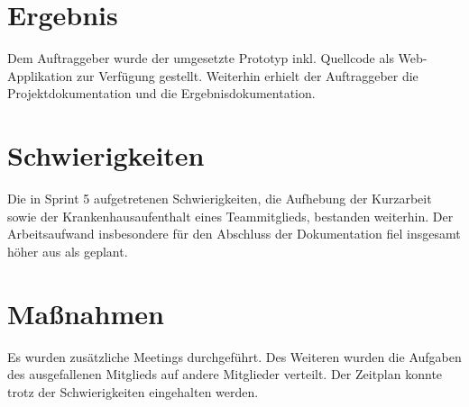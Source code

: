 \documentclass[a4paper,11pt,listof=numbered,glossary=totoc,parskip=half,toc=bib]{scrreprt}
\begin{document}
    \section{Ergebnis}
    Dem Auftraggeber wurde der umgesetzte Prototyp inkl. Quellcode als Web-Applikation zur Verfügung gestellt. Weiterhin erhielt der Auftraggeber die Projektdokumentation und die Ergebnisdokumentation.
    
    \section{Schwierigkeiten}
    Die in Sprint 5 aufgetretenen Schwierigkeiten, die Aufhebung der Kurzarbeit sowie der Krankenhausaufenthalt eines Teammitglieds, bestanden weiterhin. Der Arbeitsaufwand insbesondere für den Abschluss der Dokumentation fiel insgesamt höher aus als geplant. 
    
    \section{Maßnahmen}
Es wurden zusätzliche Meetings durchgeführt. Des Weiteren wurden die Aufgaben des ausgefallenen Mitglieds auf andere Mitglieder verteilt. Der Zeitplan konnte trotz der Schwierigkeiten eingehalten werden.

	
	\newpage	
	\setcounter{chapter}{\thelastRomanCounter} %
\renewcommand \thechapter{\Roman{chapter}}	\printbibliography[heading=bibnumbered,title=Literaturverzeichnis]
\end{document}
